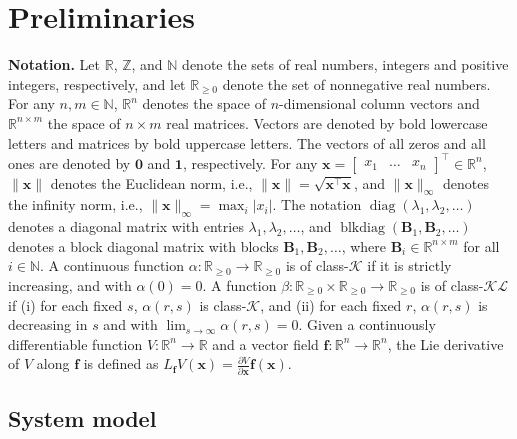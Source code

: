 \documentclass[letterpaper, 10 pt, conference]{ieeeconf}  %
\begin{document}
\section{Preliminaries} \label{sec:preliminaries}

\textbf{Notation.} Let $\mathbb{R}$, $\mathbb{Z}$, and $\mathbb{N}$ denote the sets of real numbers, integers and positive integers, respectively, and let $\mathbb{R}_{\ge 0}$ denote the set of nonnegative real numbers. For any $n, m \in \mathbb{N}$, $\mathbb{R}^n$ denotes the space of $n$-dimensional column vectors and $\mathbb{R}^{n \times m}$ the space of $n \times m$ real matrices. Vectors are denoted by bold lowercase letters and matrices by bold uppercase letters. The vectors of all zeros and all ones are denoted by $\mathbf{0}$ and $\mathbf{1}$, respectively. For any $\mathbf{x} = \begin{bmatrix} x_1 & \dots & x_n \end{bmatrix}^\top \in \mathbb{R}^n$, $\|\mathbf{x}\|$ denotes the Euclidean norm, i.e., $\|\mathbf{x}\| = \sqrt{\mathbf{x}^\top \mathbf{x}}$, and $\|\mathbf{x}\|_\infty$ denotes the infinity norm, i.e., $\|\mathbf{x}\|_\infty = \max_i{|x_i|}$. The notation $\operatorname{diag}(\lambda_1, \lambda_2, \dots)$ denotes a diagonal matrix with entries $\lambda_1, \lambda_2, \dots$, and $\operatorname{blkdiag}(\mathbf{B}_1, \mathbf{B}_2, \dots)$ denotes a block diagonal matrix with blocks $\mathbf{B}_1, \mathbf{B}_2, \dots$, where $\mathbf{B}_i \in \mathbb{R}^{n \times m}$ for all $i \in \mathbb{N}$. A continuous function $\alpha: \mathbb{R}_{\ge 0} \to \mathbb{R}_{\ge 0}$ is of class-$\mathcal{K}$ if it is strictly increasing, and with $\alpha(0) = 0$. A function $\beta: \mathbb{R}_{\ge 0} \times \mathbb{R}_{\ge 0} \to \mathbb{R}_{\ge 0}$ is of class-$\mathcal{K} \mathcal{L}$ if (i) for each fixed $s$, $\alpha(r, s)$ is class-$\mathcal{K}$, and (ii) for each fixed $r$, $\alpha(r, s)$ is decreasing in $s$ and with $\lim_{s \to \infty} \alpha(r, s) = 0$. Given a continuously differentiable function $V : \mathbb{R}^n \to \mathbb{R}$ and a vector field $\mathbf{f} : \mathbb{R}^n \to \mathbb{R}^n$, the Lie derivative of $V$ along $\mathbf{f}$ is defined as $L_\mathbf{f} V(\mathbf{x}) = \tfrac{\partial V}{\partial \mathbf{x}} \mathbf{f}(\mathbf{x})$. 

\subsection{System model}
\end{document}
